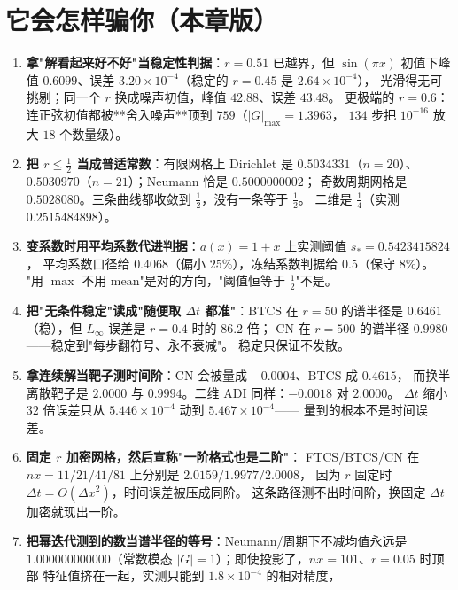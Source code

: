 

\section{它会怎样骗你（本章版）}

\begin{enumerate}
  \item \textbf{拿"解看起来好不好"当稳定性判据}：$r=0.51$ 已越界，但 $\sin(\pi x)$
        初值下峰值 $0.6099$、误差 $3.20\times10^{-4}$（稳定的 $r=0.45$ 是 $2.64\times10^{-4}$），
        光滑得无可挑剔；同一个 $r$ 换成噪声初值，峰值 $42.88$、误差 $43.48$。
        更极端的 $r=0.6$：连正弦初值都被**舍入噪声**顶到 $759$（$|G|_{\max}=1.3963$，
        $134$ 步把 $10^{-16}$ 放大 $18$ 个数量级）。
  \item \textbf{把 $r\le\frac12$ 当成普适常数}：有限网格上 Dirichlet 是
        $0.5034331$（$n=20$）、$0.5030970$（$n=21$）；Neumann 恰是 $0.5000000002$；
        奇数周期网格是 $0.5028080$。三条曲线都收敛到 $\frac12$，没有一条等于 $\frac12$。
        二维是 $\frac14$（实测 $0.2515484898$）。
  \item \textbf{变系数时用平均系数代进判据}：$a(x)=1+x$ 上实测阈值 $s_*=0.5423415824$，
        平均系数口径给 $0.4068$（偏小 $25\%$），冻结系数判据给 $0.5$（保守 $8\%$）。
        "用 $\max$ 不用 $\mathrm{mean}$"是对的方向，"阈值恒等于 $\frac12$"不是。
  \item \textbf{把"无条件稳定"读成"随便取 $\Delta t$ 都准"}：BTCS 在 $r=50$ 的谱半径是
        $0.6461$（稳），但 $L_\infty$ 误差是 $r=0.4$ 时的 $86.2$ 倍；
        CN 在 $r=500$ 的谱半径 $0.9980$——稳定到"每步翻符号、永不衰减"。
        稳定只保证不发散。
  \item \textbf{拿连续解当靶子测时间阶}：CN 会被量成 $-0.0004$、BTCS 成 $0.4615$，
        而换半离散靶子是 $2.0000$ 与 $0.9994$。二维 ADI 同样：$-0.0018$ 对 $2.0000$。
        $\Delta t$ 缩小 $32$ 倍误差只从 $5.446\times10^{-4}$ 动到 $5.467\times10^{-4}$——
        量到的根本不是时间误差。
  \item \textbf{固定 $r$ 加密网格，然后宣称"一阶格式也是二阶"}：
        FTCS/BTCS/CN 在 $nx=11/21/41/81$ 上分别是 $2.0159/1.9977/2.0008$，
        因为 $r$ 固定时 $\Delta t=O(\Delta x^2)$，时间误差被压成同阶。
        这条路径测不出时间阶，换固定 $\Delta t$ 加密就现出一阶。
  \item \textbf{把幂迭代测到的数当谱半径的等号}：Neumann/周期下不减均值永远是
        $1.000000000000$（常数模态 $|G|=1$）；即使投影了，$nx=101$、$r=0.05$ 时顶部
        特征值挤在一起，实测只能到 $1.8\times10^{-4}$ 的相对精度，

\end{enumerate}
